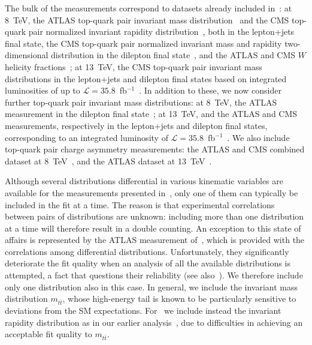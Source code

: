 The bulk of the measurements correspond to datasets already included
in~\cite{Hartland:2019bjb}: at 8~TeV,
the ATLAS top-quark pair invariant mass distribution~\cite{Aad:2015mbv} and
the CMS top-quark pair normalized invariant rapidity
distribution~\cite{Khachatryan:2015oqa}, both in the lepton+jets final state,
the CMS top-quark pair normalized invariant mass and rapidity two-dimensional
distribution in the dilepton final state~\cite{Sirunyan:2017azo},
and the ATLAS and CMS $W$ helicity fractions~\cite{Aaboud:2016hsq,
  Khachatryan:2016fky}; at 13~TeV, the CMS top-quark pair invariant mass
distributions in the lepton+jets and dilepton final states based on integrated
luminosities of up to $\mathcal{L}=35.8$~fb$^{-1}$~\cite{Khachatryan:2016mnb,
  Sirunyan:2018wem,Sirunyan:2017mzl}.
%
In addition to these, we now  consider further top-quark pair
invariant mass distributions: at 8~TeV, the ATLAS measurement in the dilepton
final state~\cite{Aaboud:2016iot}; at 13~TeV, and the ATLAS and CMS
measurements, respectively in the lepton+jets and dilepton final states, 
corresponding to an integrated luminosity of
$\mathcal{L}=35.8$~fb$^{-1}$~\cite{Aad:2019ntk,Sirunyan:2018ucr}.
%
We also include top-quark pair charge asymmetry measurements:
the ATLAS and CMS combined dataset at 8~TeV~\cite{Sirunyan:2017lvd},
and the ATLAS dataset at 13~TeV~\cite{ATLAS:2019czt}.



Although several distributions differential in various kinematic variables are
available for the measurements presented in~\cite{Khachatryan:2015oqa,
  Sirunyan:2017azo,Khachatryan:2016mnb,Sirunyan:2018wem,
  Sirunyan:2017mzl,Aaboud:2016iot,Aad:2019ntk,Sirunyan:2018ucr}, only one of
them can typically be included in the fit at a time.
%
The reason is that
experimental correlations between pairs of distributions are unknown:
including more than one distribution at a time will therefore result in
a double counting.
%
An exception to this state of affairs is represented
by the ATLAS measurement of~\cite{Aad:2015mbv}, which is provided with the
correlations among differential distributions.
%
Unfortunately, they significantly deteriorate the fit quality when
an analysis of all the available distributions is attempted, a fact that
questions their reliability (see also~\cite{Amoroso:2020lgh,Bailey:2019yze}).
We therefore include only one distribution also in this case.
%
In general, we
include the invariant mass distribution $m_{t\bar{t}}$, whose high-energy
tail 
is known to be particularly
sensitive to deviations from the SM expectations.
%
For~\cite{Khachatryan:2015oqa}
we include instead the invariant rapidity distribution as in our earlier
analysis~\cite{Hartland:2019bjb}, due to difficulties in achieving an
acceptable fit quality to $m_{t\bar{t}}$.

